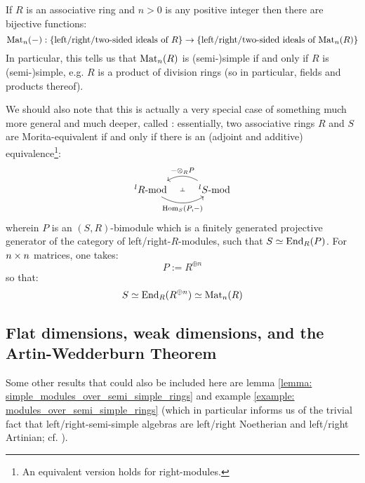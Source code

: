             \begin{example}
                If $R$ is an associative ring and $n > 0$ is any positive integer then there are bijective functions:
                    $$\mathrm{Mat}_n(-): \{\text{left/right/two-sided ideals of $R$}\} \to \{\text{left/right/two-sided ideals of $\mathrm{Mat}_n(R)$}\}$$
                In particular, this tells us that $\mathrm{Mat}_n(R)$ is (semi-)simple if and only if $R$ is (semi-)simple, e.g. $R$ is a product of division rings (so in particular, fields and products thereof).
                
                We should also note that this is actually a very special case of something much more general and much deeper, called : essentially, two associative rings $R$ and $S$ are Morita-equivalent if and only if there is an (adjoint and additive) equivalence\footnote{An equivalent version holds for right-modules.}:
                    $$
                        \begin{tikzcd}
                        	{{}^lR\mod} & {{}^lS\mod}
                        	\arrow[""{name=0, anchor=center, inner sep=0}, "{\Hom_S(P, -)}"', bend right, from=1-1, to=1-2]
                        	\arrow[""{name=1, anchor=center, inner sep=0}, "{- \tensor_R P}"', bend right, from=1-2, to=1-1]
                        	\arrow["\dashv"{anchor=center, rotate=-90}, draw=none, from=1, to=0]
                        \end{tikzcd}
                    $$
                wherein $P$ is an $(S, R)$-bimodule which is a finitely generated projective generator of the category of left/right-$R$-modules, such that $S \simeq \mathrm{End}_R(P)$. For $n \x n$ matrices, one takes:
                    $$P := R^{\oplus n}$$
                so that:
                    $$S \simeq \mathrm{End}_R(R^{\oplus n}) \simeq \mathrm{Mat}_n(R)$$
            \end{example}
    
        \subsection{Flat dimensions, weak dimensions, and the Artin-Wedderburn Theorem}
            \begin{remark}
                Some other results that could also be included here are lemma \ref{lemma: simple_modules_over_semi_simple_rings} and example \ref{example: modules_over_semi_simple_rings} (which in particular informs us of the trivial fact that left/right-semi-simple algebras are left/right Noetherian and left/right Artinian; cf. \cite[Corollary 2.6]{lam_first_course_in_noncommutative_rings}).
            \end{remark}
            

